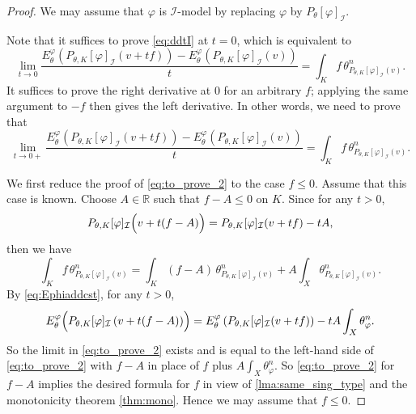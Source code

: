 \begin{proof}
We may assume that $\varphi$ is $\mathcal{I}$-model by replacing $\varphi$ by $P_{\theta}[\varphi]_{\mathcal{I}}$.

Note that it suffices to prove \eqref{eq:ddtI} at $t=0$, which is equivalent to
\begin{equation}\label{eq:to_prove_1}
\lim_{t\to 0}\frac{E_{\theta}^{\varphi}\left(P_{\theta,K}[\varphi]_{\mathcal{I}}(v+tf)\right)-E_{\theta}^{\varphi}\left(P_{\theta,K}[\varphi]_{\mathcal{I}}(v)\right)}{t}=\int_K f\,\theta^n_{P_{\theta,K}[\varphi]_{\mathcal{I}}(v)}.
\end{equation}
It suffices to prove the right derivative at $0$ for an arbitrary $f$; applying the same argument to $-f$ then gives the left derivative. In other words, we need to prove that
\begin{equation}\label{eq:to_prove_2}
\lim_{t\to 0+}\frac{E_{\theta}^{\varphi}\left(P_{\theta,K}[\varphi]_{\mathcal{I}}(v+tf)\right)-E_{\theta}^{\varphi}\left(P_{\theta,K}[\varphi]_{\mathcal{I}}(v)\right)}{t}=\int_K f\,\theta^n_{P_{\theta,K}[\varphi]_{\mathcal{I}}(v)}.
\end{equation}

We first reduce the proof of \eqref{eq:to_prove_2} to the case $f\leq 0$. Assume that this case is known. Choose $A\in\mathbb R$ such that $f-A\leq 0$ on $K$. Since for any $t>0$,
\[
P_{\theta,K}[\varphi]_{\mathcal I}\Bigl( v+t(f-A) \Bigr)= P_{\theta,K}[\varphi]_{\mathcal I}(v+tf)-tA,
\]
then we have
\[
    \int_K f\, \theta^n_{P_{\theta,K}[\varphi]_{\mathcal{I}}(v)}=\int_K (f-A)\, \theta^n_{P_{\theta,K}[\varphi]_{\mathcal{I}}(v)}+A\int_X \theta^n_{P_{\theta,K}[\varphi]_{\mathcal{I}}(v)}.
\]
By \eqref{eq:Ephiaddcst}, for any $t>0$,
\[
    E_{\theta}^{\varphi}\Bigl(P_{\theta,K}[\varphi]_{\mathcal{I}}\left(v+t(f-A)\right)\Bigr)=E_{\theta}^{\varphi}\left(P_{\theta,K}[\varphi]_{\mathcal{I}}(v+tf)\right)-tA\int_X\theta_{\varphi}^n.
\]
So the limit in \eqref{eq:to_prove_2} exists and is equal to the left-hand side of \eqref{eq:to_prove_2} with $f-A$ in place of $f$ plus $A\int_X\theta_{\varphi}^n$.
So \eqref{eq:to_prove_2} for $f-A$ implies the desired formula for $f$ in view of \cref{lma:same_sing_type} and the monotonicity theorem \cref{thm:mono}. Hence we may assume that $f\leq 0$.



\end{proof}
